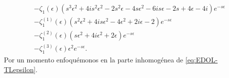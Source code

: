 \documentclass[%
 aip,
 jmp,%
 amsmath,amssymb,
 reprint,%
]{revtex4-2}
\begin{document}
{\begin{equation}
\begin{aligned}
&-\zeta_1(\epsilon) \left(s^3 \epsilon^2+4 i s^2 \epsilon^2-2 s^2 \epsilon-4 s \epsilon^2-6 i s \epsilon-2 s+4 \epsilon-4 i\right)e^{-s\epsilon}\\
&-\zeta_1^{(1)}(\epsilon) \left(s^2 \epsilon^2+4 i s \epsilon^2-4 \epsilon^2+2 i \epsilon-2\right)e^{-s\epsilon}\\
&-\zeta_1^{(2)}(\epsilon) \left(s \epsilon^2+4 i \epsilon^2+2 \epsilon\right)e^{-s\epsilon}\\
&-\zeta_1^{(3)}(\epsilon) \epsilon^2e^{-s\epsilon}.
\end{aligned}
\end{equation}
Por un momento enfoquémonos en la parte inhomogénea de \eqref{eq:EDOL-TLepsilon}.
}

\end{document}
